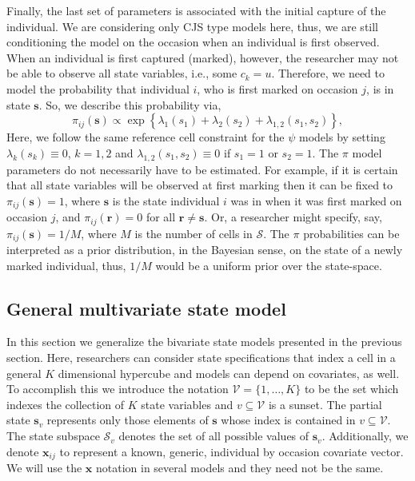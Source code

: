 \documentclass[fleqn]{article}
\newcommand{\bs}{\ensuremath{\mathbf{s}}}
\newcommand{\fS}{\ensuremath{\mathcal{S}}}
\newcommand{\br}{\ensuremath{\mathbf{r}}}
\newcommand{\fV}{\ensuremath{\mathcal{V}}}
\newcommand{\bx}{\ensuremath{\mathbf{x}}}
\begin{document}
Finally, the last set of parameters is associated with the initial capture of the individual. We are considering only CJS type models here, thus, we are still conditioning the model on the occasion when an individual is first observed. When an individual is first captured (marked), however, the researcher may not be able to observe all state variables, i.e., some $c_k = u$. Therefore, we need to model the probability that individual $i$, who is first marked on occasion $j$, is in state $\bs$. So, we describe this probability via,
\begin{equation}
\pi_{ij}(\bs) \propto \exp\left\{\lambda_1(s_1) + \lambda_2(s_2) + \lambda_{1,2}(s_1,s_2)\right\}, 
\end{equation}
Here, we follow the same reference cell constraint for the $\psi$ models by setting $\lambda_k(s_k)\equiv 0$, $k=1,2$ and $\lambda_{1,2}(s_1,s_2)\equiv 0$ if $s_1=1$ or $s_2=1$. The $\pi$ model parameters do not necessarily have to be estimated. For example, if it is certain that all state variables will be observed at first marking then it can be fixed to $\pi_{ij}(\bs) = 1$, where $\bs$ is the state individual $i$ was in when it was first marked on occasion $j$, and $\pi_{ij}(\br) = 0$ for all $\br\ne\bs$. Or, a researcher might specify, say, $\pi_{ij}(\bs) = 1/M$, where $M$ is the number of cells in $\fS$. The $\pi$ probabilities can be interpreted as a prior distribution, in the Bayesian sense, on the state of a newly marked individual, thus, $1/M$ would be a uniform prior over the state-space.
 
\subsection{General multivariate state model}

In this section we generalize the bivariate state models presented in the previous section. Here, researchers can consider state specifications that index a cell in a general $K$ dimensional hypercube and models can depend on covariates, as well. To accomplish this we introduce the notation $\fV = \{1,\dots,K\}$ to be the set which indexes the collection of $K$ state variables and $v\subseteq\fV$ is a sunset. The partial state $\bs_v$ represents only those elements of $\bs$ whose index is contained in $v\subseteq\fV$. The state subspace $\fS_v$ denotes the set of all possible values of $\bs_v$. Additionally, we denote $\bx_{ij}$ to represent a known, generic, individual by occasion covariate vector. We will use the $\bx$ notation in several models and they need not be the same.
\end{document}
